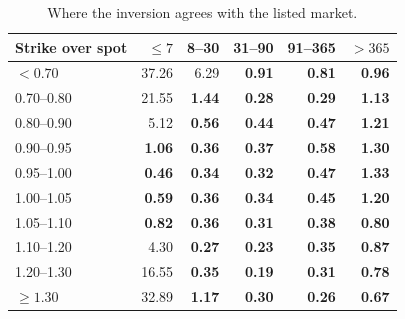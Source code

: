 \begin{table}[t]
\centering
\caption{Where the inversion agrees with the listed market.}
\label{tab:implied-domain}
\begin{tabular}{lrrrrr}
\toprule
Strike over spot & $\leq 7$ & 8--30 & 31--90 & 91--365 & $>365$ \\
\midrule
$<0.70$ & 37.26 & 6.29 & \textbf{0.91} & \textbf{0.81} & \textbf{0.96} \\
0.70--0.80 & 21.55 & \textbf{1.44} & \textbf{0.28} & \textbf{0.29} & \textbf{1.13} \\
0.80--0.90 & 5.12 & \textbf{0.56} & \textbf{0.44} & \textbf{0.47} & \textbf{1.21} \\
0.90--0.95 & \textbf{1.06} & \textbf{0.36} & \textbf{0.37} & \textbf{0.58} & \textbf{1.30} \\
0.95--1.00 & \textbf{0.46} & \textbf{0.34} & \textbf{0.32} & \textbf{0.47} & \textbf{1.33} \\
1.00--1.05 & \textbf{0.59} & \textbf{0.36} & \textbf{0.34} & \textbf{0.45} & \textbf{1.20} \\
1.05--1.10 & \textbf{0.82} & \textbf{0.36} & \textbf{0.31} & \textbf{0.38} & \textbf{0.80} \\
1.10--1.20 & 4.30 & \textbf{0.27} & \textbf{0.23} & \textbf{0.35} & \textbf{0.87} \\
1.20--1.30 & 16.55 & \textbf{0.35} & \textbf{0.19} & \textbf{0.31} & \textbf{0.78} \\
$\geq 1.30$ & 32.89 & \textbf{1.17} & \textbf{0.30} & \textbf{0.26} & \textbf{0.67} \\
\bottomrule
\end{tabular}
\par{}
\end{table}
